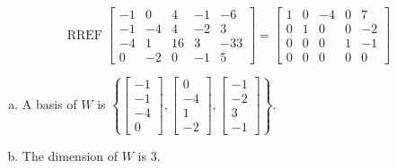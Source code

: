 \begin{exerciseAnswer} 


\[\operatorname{RREF} \left[\begin{array}{ccccc}
-1 & 0 & 4 & -1 & -6 \\
-1 & -4 & 4 & -2 & 3 \\
-4 & 1 & 16 & 3 & -33 \\
0 & -2 & 0 & -1 & 5
\end{array}\right] = \left[\begin{array}{ccccc}
1 & 0 & -4 & 0 & 7 \\
0 & 1 & 0 & 0 & -2 \\
0 & 0 & 0 & 1 & -1 \\
0 & 0 & 0 & 0 & 0
\end{array}\right] \]


\begin{enumerate}[(a)]
\item A basis of \(W\) is \( \left\{ \left[\begin{array}{c}
-1 \\
-1 \\
-4 \\
0
\end{array}\right] , \left[\begin{array}{c}
0 \\
-4 \\
1 \\
-2
\end{array}\right] , \left[\begin{array}{c}
-1 \\
-2 \\
3 \\
-1
\end{array}\right] \right\} \).
\item The dimension of \(W\) is \( 3 \).
\end{enumerate}
    
\end{exerciseAnswer}
    
